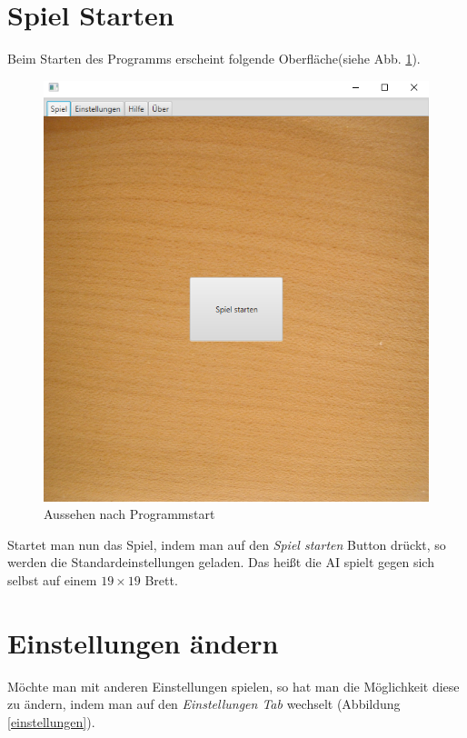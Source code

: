 \documentclass[11pt]{article}
\newcommand{\1}{{\mathds{1}}}
\newcommand{\imagewidth}{.4\textheight}%
\begin{document}
	\section{Spiel Starten}
	Beim Starten des Programms erscheint folgende Oberfläche(siehe Abb. \ref{starten}).
	\FloatBarrier
	\begin{figure}[h]
		\centering
		\includegraphics[width=\imagewidth]{starten.png}
		\caption{Aussehen nach Programmstart}
		\label{starten}
	\end{figure}
	Startet man nun das Spiel, indem man auf den \textit{Spiel starten} Button drückt, so werden die Standardeinstellungen geladen.
	Das heißt die AI spielt gegen sich selbst auf einem $19 \times 19$ Brett. 

	\FloatBarrier
	
	\section{Einstellungen ändern}
	\FloatBarrier
	Möchte man mit anderen Einstellungen spielen, so hat man die Möglichkeit diese zu ändern, indem man auf den \textit{Einstellungen Tab} wechselt (Abbildung \ref{einstellungen}).
\end{document}
